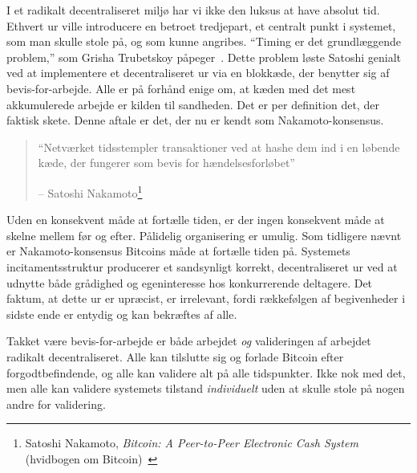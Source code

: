 \documentclass[paper=6in:9in,pagesize=pdftex,headinclude=on,footinclude=on,12pt]{scrbook}
\begin{document}
I et radikalt decentraliseret miljø har vi ikke den luksus at have absolut tid. Ethvert ur ville introducere en betroet tredjepart, et centralt punkt i systemet, som man skulle stole på, og som kunne angribes. \enquote{Timing er det grundlæggende problem,} som Grisha Trubetskoy påpeger~\cite{pow-clock}. Dette problem løste Satoshi genialt ved at implementere et decentraliseret ur via en blokkæde, der benytter sig af bevis-for-arbejde. Alle er på forhånd enige om, at kæden med det mest akkumulerede arbejde er kilden til sandheden. Det er per definition det, der faktisk skete. Denne aftale er det, der nu er kendt som Nakamoto-konsensus.\begin{quotation}\begin{samepage} \enquote{Netværket tidsstempler transaktioner ved at hashe dem ind i en løbende kæde, der fungerer som bevis for hændelsesforløbet} \begin{flushright} -- Satoshi Nakamoto\footnote{Satoshi Nakamoto, \textit{Bitcoin: A Peer-to-Peer Electronic Cash System} (hvidbogen om Bitcoin)~\cite{whitepaper}}
\end{flushright}\end{samepage}\end{quotation}

Uden en konsekvent måde at fortælle tiden, er der ingen konsekvent måde at skelne mellem før og efter. Pålidelig organisering er umulig. Som tidligere nævnt er Nakamoto-konsensus Bitcoins måde at fortælle tiden på. Systemets incitamentsstruktur producerer et sandsynligt korrekt, decentraliseret ur ved at udnytte både grådighed og egeninteresse hos konkurrerende deltagere. Det faktum, at dette ur er upræcist, er irrelevant, fordi rækkefølgen af begivenheder i sidste ende er entydig og kan bekræftes af alle.

Takket være bevis-for-arbejde er både arbejdet \textit{og} valideringen af arbejdet radikalt decentraliseret. Alle kan tilslutte sig og forlade Bitcoin efter forgodtbefindende, og alle kan validere alt på alle tidspunkter. Ikke nok med det, men alle kan validere systemets tilstand \textit{individuelt} uden at skulle stole på nogen andre for validering.
\end{document}
